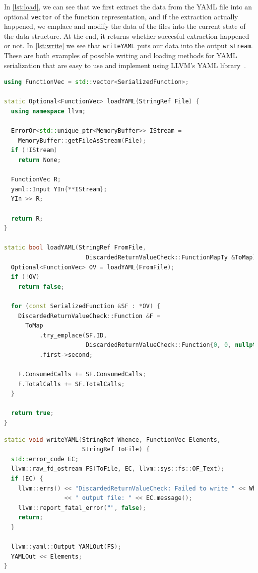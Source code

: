 In \cref{lst:load}, we can see that we first extract the data from the YAML file into an optional \lstinline{vector} of the function representation,
and if the extraction actually happened, we emplace and modify the data of the files into the current state of the data structure. At the end, it returns
whether succesful extraction happened or not.
In \cref{lst:write} we see that \texttt{writeYAML} puts our data into the output \texttt{stream}.
These are both examples of possible writing and loading methods for YAML serialization that are easy to use and implement using LLVM's YAML library~\cite{yamllib}.

\begin{lstlisting}[language={C++},caption={Functions for loading.},label={lst:load}]
using FunctionVec = std::vector<SerializedFunction>;

static Optional<FunctionVec> loadYAML(StringRef File) {
  using namespace llvm;
  
  ErrorOr<std::unique_ptr<MemoryBuffer>> IStream =
  	MemoryBuffer::getFileAsStream(File);
  if (!IStream)
    return None;
  
  FunctionVec R;
  yaml::Input YIn{**IStream};
  YIn >> R;
  
  return R;
}
  
static bool loadYAML(StringRef FromFile,
					   DiscardedReturnValueCheck::FunctionMapTy &ToMap) {
  Optional<FunctionVec> OV = loadYAML(FromFile);
  if (!OV)
    return false;
  
  for (const SerializedFunction &SF : *OV) {
    DiscardedReturnValueCheck::Function &F =
      ToMap
    	  .try_emplace(SF.ID,
    				   DiscardedReturnValueCheck::Function{0, 0, nullptr, {}})
    	  .first->second;
    
    F.ConsumedCalls += SF.ConsumedCalls;
    F.TotalCalls += SF.TotalCalls;
  }
  
  return true;
}
\end{lstlisting}

\begin{lstlisting}[language={C++},caption={Function for writing.},label={lst:write}]
static void writeYAML(StringRef Whence, FunctionVec Elements,
                      StringRef ToFile) {
  std::error_code EC;
  llvm::raw_fd_ostream FS(ToFile, EC, llvm::sys::fs::OF_Text);
  if (EC) {
    llvm::errs() << "DiscardedReturnValueCheck: Failed to write " << Whence
                 << " output file: " << EC.message();
    llvm::report_fatal_error("", false);
    return;
  }

  llvm::yaml::Output YAMLOut(FS);
  YAMLOut << Elements;
}
\end{lstlisting}

